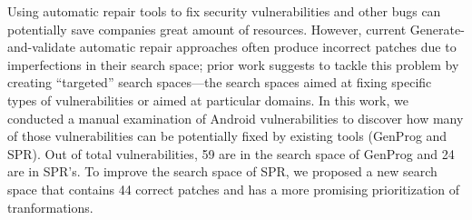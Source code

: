 Using automatic repair tools to fix security vulnerabilities and other bugs can potentially save companies great amount of resources. However, current Generate-and-validate automatic repair approaches often produce incorrect patches due to imperfections in their search space; prior work suggests to tackle this problem by creating ``targeted'' search spaces---the search spaces aimed at fixing specific types of vulnerabilities or aimed at particular domains. In this work, we conducted a manual examination of \numvuln Android vulnerabilities to discover how many of those vulnerabilities can be potentially fixed by existing tools (GenProg and SPR). Out of total \numvuln vulnerabilities, 59 are in the search space of GenProg and 24 are in SPR's. To improve the search space of SPR, we proposed a new search space that contains 44 correct patches and has a more promising prioritization of tranformations.
